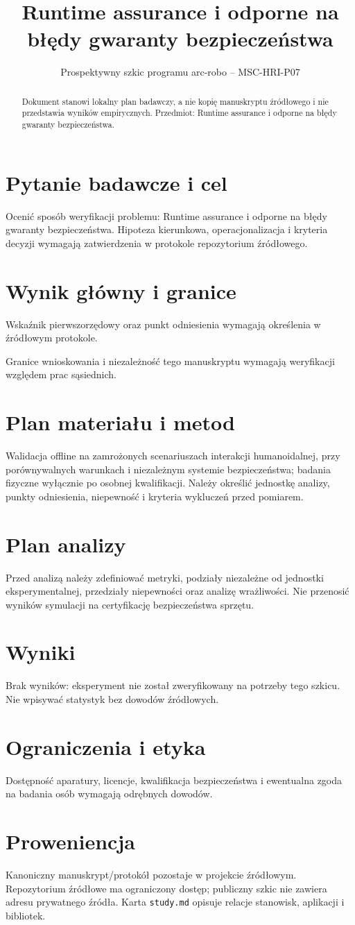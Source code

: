 \documentclass[11pt,a4paper]{article}
\title{Runtime assurance i odporne na błędy gwaranty bezpieczeństwa}
\author{}
\date{Prospektywny szkic programu arc-robo -- MSC-HRI-P07}
\begin{document}
\maketitle
\begin{abstract}
Dokument stanowi lokalny plan badawczy, a nie kopię manuskryptu źródłowego i nie przedstawia wyników empirycznych. Przedmiot: Runtime assurance i odporne na błędy gwaranty bezpieczeństwa.
\end{abstract}
\section{Pytanie badawcze i cel}
Ocenić sposób weryfikacji problemu: Runtime assurance i odporne na błędy gwaranty bezpieczeństwa. Hipoteza kierunkowa, operacjonalizacja i kryteria decyzji wymagają zatwierdzenia w protokole repozytorium źródłowego.
\section{Wynik główny i granice}
Wskaźnik pierwszorzędowy oraz punkt odniesienia wymagają określenia w źródłowym protokole.

Granice wnioskowania i niezależność tego manuskryptu wymagają weryfikacji względem prac sąsiednich.
\section{Plan materiału i metod}
Walidacja offline na zamrożonych scenariuszach interakcji humanoidalnej, przy porównywalnych warunkach i niezależnym systemie bezpieczeństwa; badania fizyczne wyłącznie po osobnej kwalifikacji. Należy określić jednostkę analizy, punkty odniesienia, niepewność i kryteria wykluczeń przed pomiarem.
\section{Plan analizy}
Przed analizą należy zdefiniować metryki, podziały niezależne od jednostki eksperymentalnej, przedziały niepewności oraz analizę wrażliwości. Nie przenosić wyników symulacji na certyfikację bezpieczeństwa sprzętu.
\section{Wyniki}
Brak wyników: eksperyment nie został zweryfikowany na potrzeby tego szkicu. Nie wpisywać statystyk bez dowodów źródłowych.
\section{Ograniczenia i etyka}
Dostępność aparatury, licencje, kwalifikacja bezpieczeństwa i ewentualna zgoda na badania osób wymagają odrębnych dowodów.
\section{Proweniencja}
Kanoniczny manuskrypt/protokół pozostaje w projekcie źródłowym. Repozytorium źródłowe ma ograniczony dostęp; publiczny szkic nie zawiera adresu prywatnego źródła. Karta \texttt{study.md} opisuje relacje stanowisk, aplikacji i bibliotek.
\end{document}
